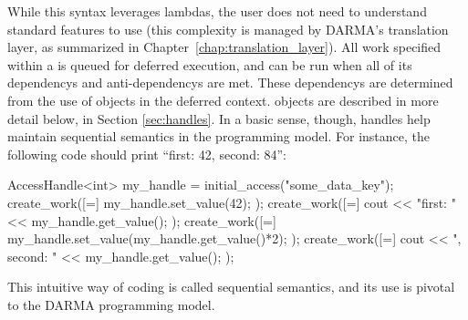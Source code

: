 While this syntax leverages  lambdas, the user does not need to understand
 standard features to use  (this
complexity is managed by DARMA's translation layer, as summarized in
Chapter~\ref{chap:translation_layer}).  All work specified within a
 is queued for deferred execution, and can be run when
all of its \glspl{dependency} and \glspl{anti-dependency} are met.  
These \glspl{dependency} are determined from the use of 
 objects in the deferred context. 
 objects are described in more detail below, in
Section \ref{sec:handles}.  In a basic sense, though, handles help maintain
\gls{sequential semantics} in the programming model.  For instance, the
following code should print ``first: 42, second: 84'':
\begin{CppCode}
AccessHandle<int> my_handle = initial_access("some_data_key");
create_work([=]{
  my_handle.set_value(42);
});
create_work([=]{
  cout << "first: " << my_handle.get_value();
});
create_work([=]{
  my_handle.set_value(my_handle.get_value()*2);
});
create_work([=]{
  cout << ", second: " << my_handle.get_value();
});
\end{CppCode}
This intuitive way of coding is called \gls{sequential semantics}, and its use
is pivotal to the DARMA programming model.

